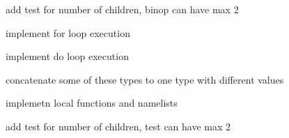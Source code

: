 
\begin{DoxyRefList}
\item[\label{todo__todo000001}%
\hypertarget{todo__todo000001}{}%
Class \hyperlink{classBinop}{Binop} ]add test for number of children, binop can have max 2  
\item[\label{todo__todo000004}%
\hypertarget{todo__todo000004}{}%
Member \hyperlink{classLoop_a32977a6ab0e1311d78c603db03f895d4}{Loop\+:\+:execute} (\hyperlink{classEnvironment}{Environment} \&env)]implement for loop execution 

implement do loop execution  
\item[\label{todo__todo000002}%
\hypertarget{todo__todo000002}{}%
Member \hyperlink{classNode_a8dad370be1595f49e0a7c2406a91e867}{Node\+:\+:Type} ]concatenate some of these types to one type with different values 

implemetn local functions and namelists  
\item[\label{todo__todo000003}%
\hypertarget{todo__todo000003}{}%
Class \hyperlink{classTest}{Test} ]add test for number of children, test can have max 2 
\end{DoxyRefList}